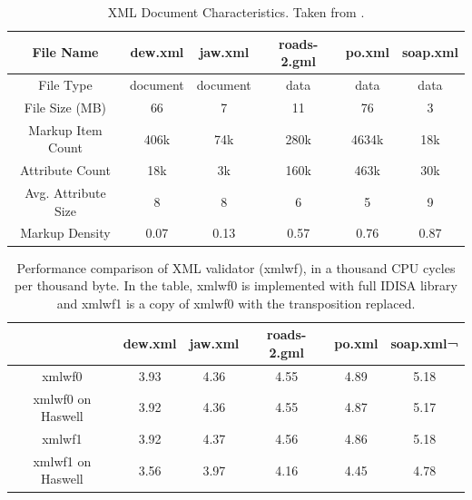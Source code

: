 \begin{table}[h]
\centering
\begin{tabular}{|c|c|c|c|c|c|}
\hline
File Name           & dew.xml & jaw.xml & roads-2.gml & po.xml  & soap.xml \\ \hline
File Type           & document   & document   & data      & data    & data     \\ \hline
File Size (MB)      & 66      & 7       & 11    & 76   & 3     \\ \hline
Markup Item Count   & 406k     & 74k      & 280k    & 4634k & 18k    \\ \hline
Attribute Count     & 18k      & 3k       & 160k    & 463k  & 30k    \\ \hline
Avg. Attribute Size & 8          & 8          & 6         & 5       & 9        \\ \hline
Markup Density      & 0.07       & 0.13       & 0.57      & 0.76    & 0.87     \\ \hline
\end{tabular}
\caption{XML Document Characteristics. Taken from \cite{rob_xml}.}
\label{table:xmlwf_data}
\end{table}

\begin{table}[h]
\centering
\begin{tabular}{|c|c|c|c|c|c|}
\hline
        & dew.xml  &  jaw.xml  &  roads-2.gml  &  po.xml  & soap.xml¬ \\\hline
xmlwf0   &  3.93   &    4.36   &   4.55   &   4.89   &   5.18 \\ \hline
xmlwf0 on Haswell   &  3.92   &   4.36   &   4.55   &   4.87   &   5.17 \\ \hline

xmlwf1   &  3.92   &   4.37   &   4.56   &   4.86   &   5.18 \\ \hline
xmlwf1 on Haswell &   3.56   &   3.97   &   4.16   &   4.45   &   4.78 \\ \hline
\end{tabular}
\caption[Performance comparison of XML Validator (xmlwf)]{Performance comparison of XML validator (xmlwf), in a thousand CPU cycles per thousand byte. In the table, xmlwf0 is implemented with full IDISA library and xmlwf1 is a copy of xmlwf0 with the transposition replaced.}
\label{table:xmlwf_perf}
\end{table}

